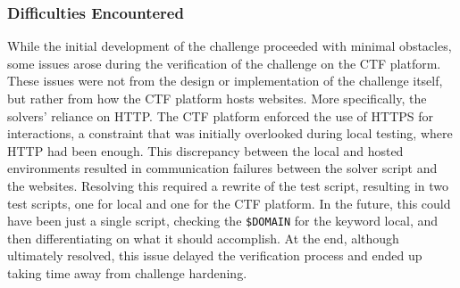 \subsubsection{Difficulties Encountered}


While the initial development of the challenge proceeded with minimal obstacles, some issues arose during the verification of the challenge on the CTF platform. These issues were not from the design or implementation of the challenge itself, but rather from how the CTF platform hosts websites. More specifically, the solvers' reliance on HTTP. The CTF platform enforced the use of HTTPS for interactions, a constraint that was initially overlooked during local testing, where HTTP had been enough. This discrepancy between the local and hosted environments resulted in communication failures between the solver script and the websites. Resolving this required a rewrite of the test script, resulting in two test scripts, one for local and one for the CTF platform. In the future, this could have been just a single script, checking the \texttt{\$DOMAIN} for the keyword local, and then differentiating on what it should accomplish. At the end, although ultimately resolved, this issue delayed the verification process and ended up taking time away from challenge hardening.
